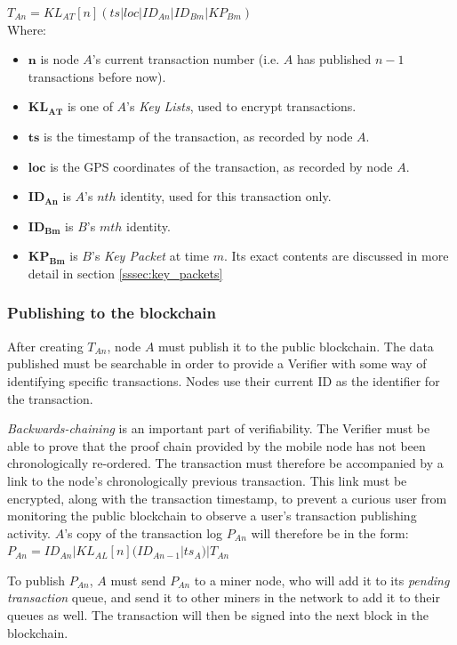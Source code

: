 $T_{An} = KL_{AT}[n](ts|loc|ID_{An}|ID_{Bm}|KP_{Bm})$
\\

Where:
\begin{itemize}[noitemsep,topsep=0pt]
	\item[] $\mathbf{n}$ is node $A$'s current transaction number (i.e. $A$ has published $n-1$ transactions before now).
	\item[] $\mathbf{KL_{AT}}$ is one of $A$'s \textit{Key Lists}, used to encrypt transactions.	
	\item[] $\mathbf{ts}$ is the timestamp of the transaction, as recorded by node $A$.
	\item[] $\mathbf{loc}$ is the GPS coordinates of the transaction, as recorded by node $A$.
	\item[] $\mathbf{ID_{An}}$ is $A$'s $nth$ identity, used for this transaction only.
	\item[] $\mathbf{ID_{Bm}}$ is $B$'s $mth$ identity.
	\item[] $\mathbf{KP_{Bm}}$ is $B$'s \textit{Key Packet} at time $m$. Its exact contents are discussed in more detail in section \ref{sssec:key_packets}
\end{itemize}

\subsubsection{Publishing to the blockchain}
After creating $T_{An}$, node $A$ must publish it to the public blockchain. The data published must be searchable in order to provide a Verifier with some way of identifying specific transactions. Nodes use their current ID as the identifier for the transaction.

\textit{Backwards-chaining} is an important part of verifiability. The Verifier must be able to prove that the proof chain provided by the mobile node has not been chronologically re-ordered. The transaction must therefore be accompanied by a link to the node's chronologically previous transaction. This link must be encrypted, along with the transaction timestamp, to prevent a curious user from monitoring the public blockchain to observe a user's transaction publishing activity. $A$'s copy of the transaction log $P_{An}$ will therefore be in the form:
\\

$P_{An} = ID_{An}|KL_{AL}[n](ID_{An-1}|ts_A)|T_{An}$

\null
To publish $P_{An}$, $A$ must send $P_{An}$ to a miner node, who will add it to its \textit{pending transaction} queue, and send it to other miners in the network to add it to their queues as well. The transaction will then be signed into the next block in the blockchain.

